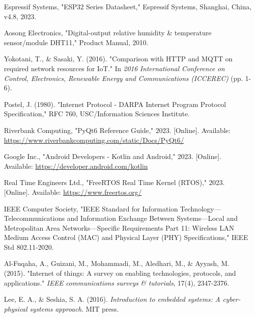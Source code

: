 \documentclass[conference,a4paper]{IEEEtran}
\begin{document}
\begin{thebibliography}{99}
Espressif Systems, "ESP32 Series Datasheet," Espressif Systems, Shanghai, China, v4.8, 2023.

Aosong Electronics, "Digital-output relative humidity \& temperature sensor/module DHT11," Product Manual, 2010.

Yokotani, T., \& Sasaki, Y. (2016). "Comparison with HTTP and MQTT on required network resources for IoT." In \textit{2016 International Conference on Control, Electronics, Renewable Energy and Communications (ICCEREC)} (pp. 1-6).

Postel, J. (1980). "Internet Protocol - DARPA Internet Program Protocol Specification," RFC 760, USC/Information Sciences Institute.

Riverbank Computing, "PyQt6 Reference Guide," 2023. [Online]. Available: \url{https://www.riverbankcomputing.com/static/Docs/PyQt6/}

Google Inc., "Android Developers - Kotlin and Android," 2023. [Online]. Available: \url{https://developer.android.com/kotlin}

Real Time Engineers Ltd., "FreeRTOS Real Time Kernel (RTOS)," 2023. [Online]. Available: \url{https://www.freertos.org/}

IEEE Computer Society, "IEEE Standard for Information Technology—Telecommunications and Information Exchange Between Systems—Local and Metropolitan Area Networks—Specific Requirements Part 11: Wireless LAN Medium Access Control (MAC) and Physical Layer (PHY) Specifications," IEEE Std 802.11-2020.

Al-Fuqaha, A., Guizani, M., Mohammadi, M., Aledhari, M., \& Ayyash, M. (2015). "Internet of things: A survey on enabling technologies, protocols, and applications." \textit{IEEE communications surveys \& tutorials}, 17(4), 2347-2376.

Lee, E. A., \& Seshia, S. A. (2016). \textit{Introduction to embedded systems: A cyber-physical systems approach}. MIT press.

\end{thebibliography}
\end{document}
